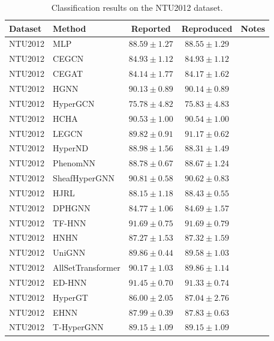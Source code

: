 \vspace{1.7em}

\begin{table}[H]
    \centering \small
    \renewcommand{\arraystretch}{1.12} 
    \begin{tabular}{llccc}
        \toprule
        Dataset & Method & Reported & Reproduced & Notes \\
        \midrule
        NTU2012 & MLP & \(88.59 \pm 1.27\) & \(88.55 \pm 1.29\) & \\
        NTU2012 & CEGCN & \(84.93 \pm 1.12\) & \(84.93 \pm 1.12\) & \\
        NTU2012 & CEGAT & \(84.14 \pm 1.77\) & \(84.17 \pm 1.62\) & \\
        \grprule
        NTU2012 & HGNN & \(90.13 \pm 0.89\) & \(90.14 \pm 0.89\) & \\
        NTU2012 & HyperGCN & \(75.78 \pm 4.82\) & \(75.83 \pm 4.83\) & \\
        NTU2012 & HCHA & \(90.53 \pm 1.00\) & \(90.54 \pm 1.00\) & \\
        NTU2012 & LEGCN & \(89.82 \pm 0.91\) & \(91.17 \pm 0.62\) & \\
        NTU2012 & HyperND & \(88.98 \pm 1.56\) & \(88.31 \pm 1.49\) & \\
        NTU2012 & PhenomNN & \(88.78 \pm 0.67\) & \(88.67 \pm 1.24\) & \\
        NTU2012 & SheafHyperGNN & \(90.81 \pm 0.58\) & \(90.62 \pm 0.83\) & \\
        NTU2012 & HJRL & \(88.15 \pm 1.18\) & \(88.43 \pm 0.55\) & \\
        NTU2012 & DPHGNN & \(84.77 \pm 1.06\) & \(84.69 \pm 1.57\) & \\
        NTU2012 & TF-HNN & \(91.69 \pm 0.75\) & \(91.69 \pm 0.79\) & \\
        \grprule
        NTU2012 & HNHN & \(87.27 \pm 1.53\) & \(87.32 \pm 1.59\) & \\
        NTU2012 & UniGNN & \(89.86 \pm 0.44\) & \(89.58 \pm 1.03\) & \\
        NTU2012 & AllSetTransformer & \(90.17 \pm 1.03\) & \(89.86 \pm 1.14\) & \\
        NTU2012 & ED-HNN & \(91.45 \pm 0.70\) & \(91.33 \pm 0.74\) & \\
        NTU2012 & HyperGT & \(86.00 \pm 2.05\) & \(87.04 \pm 2.76\) & \\
        \grprule
        NTU2012 & EHNN & \(87.99 \pm 0.39\) & \(87.83 \pm 0.63\) & \\
        NTU2012 & T-HyperGNN & \(89.15 \pm 1.09\) & \(89.15 \pm 1.09\) & \\
        \bottomrule
    \end{tabular}
    \caption{Classification results on the NTU2012 dataset.}
\end{table}

